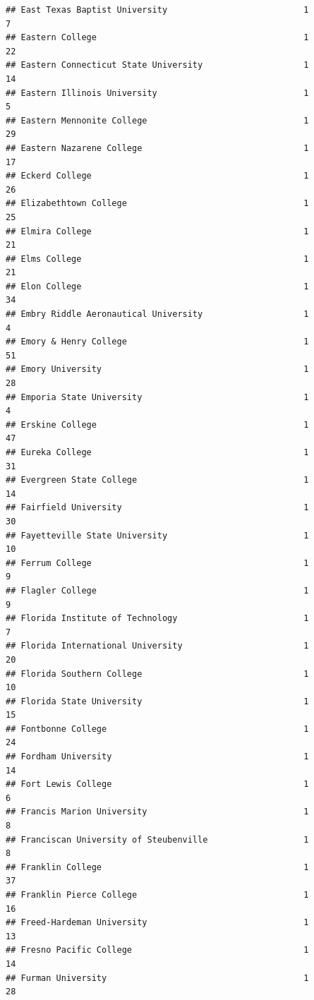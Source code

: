 \documentclass[
]{article}
\begin{document}
\begin{verbatim}
## East Texas Baptist University                           1           7
## Eastern College                                         1          22
## Eastern Connecticut State University                    1          14
## Eastern Illinois University                             1           5
## Eastern Mennonite College                               1          29
## Eastern Nazarene College                                1          17
## Eckerd College                                          1          26
## Elizabethtown College                                   1          25
## Elmira College                                          1          21
## Elms College                                            1          21
## Elon College                                            1          34
## Embry Riddle Aeronautical University                    1           4
## Emory & Henry College                                   1          51
## Emory University                                        1          28
## Emporia State University                                1           4
## Erskine College                                         1          47
## Eureka College                                          1          31
## Evergreen State College                                 1          14
## Fairfield University                                    1          30
## Fayetteville State University                           1          10
## Ferrum College                                          1           9
## Flagler College                                         1           9
## Florida Institute of Technology                         1           7
## Florida International University                        1          20
## Florida Southern College                                1          10
## Florida State University                                1          15
## Fontbonne College                                       1          24
## Fordham University                                      1          14
## Fort Lewis College                                      1           6
## Francis Marion University                               1           8
## Franciscan University of Steubenville                   1           8
## Franklin College                                        1          37
## Franklin Pierce College                                 1          16
## Freed-Hardeman University                               1          13
## Fresno Pacific College                                  1          14
## Furman University                                       1          28

\end{verbatim}
\end{document}
